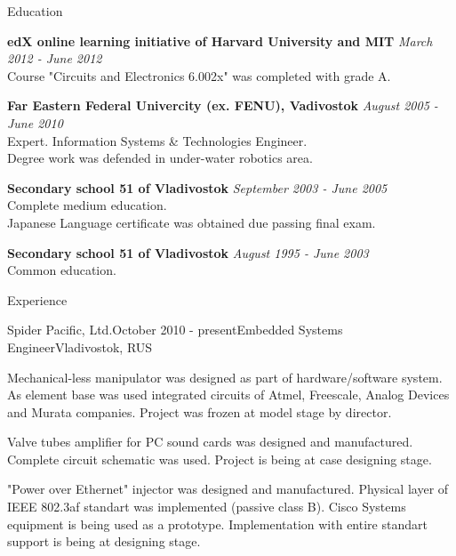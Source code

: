 \documentclass{resume}
\begin{document}

\begin{rSection}{Education}

{\bf edX online learning initiative of Harvard University and MIT} \hfill {\em March 2012 - June 2012} \\
Course "Circuits and Electronics 6.002x" was completed with grade A.

{\bf Far Eastern Federal Univercity (ex. FENU), Vadivostok} \hfill {\em August 2005 - June 2010} \\ 
Expert. Information Systems \& Technologies Engineer. \\
Degree work was defended in under-water robotics area.

{\bf Secondary school 51 of Vladivostok} \hfill {\em September 2003  - June 2005}\\
Complete medium education. \\
Japanese Language certificate was obtained due passing final exam.

{\bf Secondary school 51 of Vladivostok} \hfill {\em August 1995 - June 2003}\\
Common education.

\end{rSection}


\begin{rSection}{Experience}

\begin{rSubsection}{Spider Pacific, Ltd.}{October 2010 - present}{Embedded Systems Engineer}{Vladivostok, RUS}
\item Mechanical-less manipulator was designed as part of hardware/software system. As element base was used 
integrated circuits of Atmel, Freescale, Analog Devices and Murata companies. Project was frozen at model stage by director.
\item Valve tubes amplifier for PC sound cards was designed and manufactured. Complete circuit schematic was 
used. Project is being at case designing stage.
\item "Power over Ethernet" injector was designed and manufactured. Physical layer of IEEE 802.3af standart was 
implemented (passive class B). Cisco Systems equipment is being used as a prototype. Implementation with entire 
standart support is being at designing stage.
\end{rSubsection}

\end{rSection}
\end{document}
